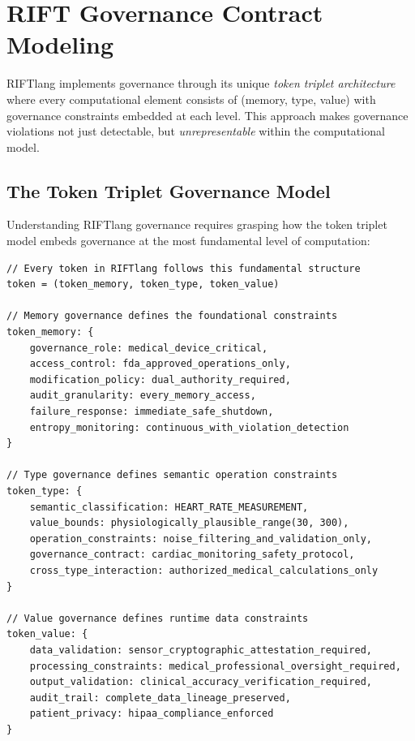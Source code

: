 \section{RIFT Governance Contract Modeling}

RIFTlang implements governance through its unique \textit{token triplet architecture} where every computational element consists of (memory, type, value) with governance constraints embedded at each level. This approach makes governance violations not just detectable, but \textit{unrepresentable} within the computational model.

\subsection{The Token Triplet Governance Model}

Understanding RIFTlang governance requires grasping how the token triplet model embeds governance at the most fundamental level of computation:

\begin{lstlisting}[language=rift, caption=Token Triplet with Embedded Governance]
// Every token in RIFTlang follows this fundamental structure
token = (token_memory, token_type, token_value)

// Memory governance defines the foundational constraints
token_memory: {
    governance_role: medical_device_critical,
    access_control: fda_approved_operations_only,
    modification_policy: dual_authority_required,
    audit_granularity: every_memory_access,
    failure_response: immediate_safe_shutdown,
    entropy_monitoring: continuous_with_violation_detection
}

// Type governance defines semantic operation constraints  
token_type: {
    semantic_classification: HEART_RATE_MEASUREMENT,
    value_bounds: physiologically_plausible_range(30, 300),
    operation_constraints: noise_filtering_and_validation_only,
    governance_contract: cardiac_monitoring_safety_protocol,
    cross_type_interaction: authorized_medical_calculations_only
}

// Value governance defines runtime data constraints
token_value: {
    data_validation: sensor_cryptographic_attestation_required,
    processing_constraints: medical_professional_oversight_required,
    output_validation: clinical_accuracy_verification_required,
    audit_trail: complete_data_lineage_preserved,
    patient_privacy: hipaa_compliance_enforced
}
\end{lstlisting}

